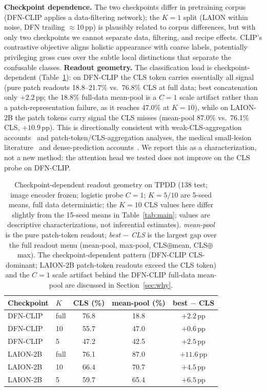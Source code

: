\documentclass[10pt,a4paper]{article}
\begin{document}
\textbf{Checkpoint dependence.} The two checkpoints differ in pretraining corpus (DFN-CLIP applies a data-filtering network); the $K{=}1$ split (LAION within noise, DFN trailing $\approx$10\,pp) is plausibly related to corpus differences, but with only two checkpoints we cannot separate data, filtering, and recipe effects. CLIP's contrastive objective aligns holistic appearance with coarse labels, potentially privileging gross cues over the subtle local distinctions that separate the confusable classes.
\textbf{Readout geometry.} The classification load is checkpoint-dependent (Table~\ref{tab:readout}): on DFN-CLIP the CLS token carries essentially all signal (pure patch readouts 18.8--21.7\% vs.\ 76.8\% CLS at full data; best concatenation only $+2.2$\,pp; the 18.8\% full-data mean-pool is a $C{=}1$ scale artifact rather than a patch-representation failure, as it reaches 47.0\% at $K{=}10$), while on LAION-2B the patch tokens carry signal the CLS misses (mean-pool 87.0\% vs.\ 76.1\% CLS, $+10.9$\,pp). This is directionally consistent with weak-CLS-aggregation accounts~\cite{shi2026registers} and patch-token/CLS-aggregation analyses, the medical small-lesion literature~\cite{cxr2026frozen,dinov3mil2026} and dense-prediction accounts~\cite{traceclip2026}. We report this as a characterization, not a new method: the attention head we tested does not improve on the CLS probe on DFN-CLIP.

\begin{table}[!ht]
\centering
\caption{Checkpoint-dependent readout geometry on TPDD (138 test; image encoder frozen; logistic probe $C{=}1$; $K{=}5/10$ are 5-seed means, full data deterministic; the $K{=}10$ CLS values here differ slightly from the 15-seed means in Table~\ref{tab:main}; values are descriptive characterizations, not inferential estimates). \emph{mean-pool} is the pure patch-token readout; \emph{best $-$ CLS} is the largest gap over the full readout menu (mean-pool, max-pool, CLS$\oplus$mean, CLS$\oplus$max). The checkpoint-dependent pattern (DFN-CLIP CLS-dominant; LAION-2B patch-token readouts exceed the CLS token) and the $C{=}1$ scale artifact behind the DFN-CLIP full-data mean-pool are discussed in Section~\ref{sec:why}.}
\label{tab:readout}
\begin{tabular}{llccc}
\toprule
\textbf{Checkpoint} & \textbf{$K$} & \textbf{CLS (\%)} & \textbf{mean-pool (\%)} & \textbf{best $-$ CLS} \\
\midrule
DFN-CLIP & full & 76.8 & 18.8 & $+2.2$\,pp \\
DFN-CLIP & 10 & 55.7 & 47.0 & $+0.6$\,pp \\
DFN-CLIP & 5 & 47.2 & 42.5 & $+2.5$\,pp \\
\midrule
LAION-2B & full & 76.1 & 87.0 & $+11.6$\,pp \\
LAION-2B & 10 & 66.4 & 70.7 & $+4.5$\,pp \\
LAION-2B & 5 & 59.7 & 65.4 & $+6.5$\,pp \\
\bottomrule
\end{tabular}
\end{table}
\end{document}
